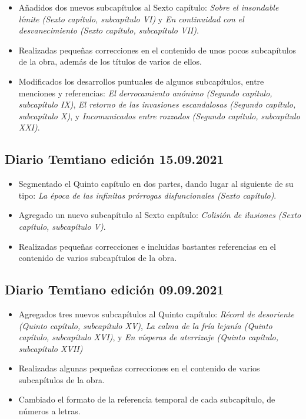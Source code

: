 \documentclass[
]{book}
\begin{document}
\begin{itemize}
\item
  Añadidos dos nuevos subcapítulos al Sexto capítulo: \emph{Sobre el insondable límite (Sexto capítulo, subcapítulo VI)} y \emph{En continuidad con el desvanecimiento (Sexto capítulo, subcapítulo VII)}.
\item
  Realizadas pequeñas correcciones en el contenido de unos pocos subcapítulos de la obra, además de los títulos de varios de ellos.
\item
  Modificados los desarrollos puntuales de algunos subcapítulos, entre menciones y referencias: \emph{El derrocamiento anónimo (Segundo capítulo, subcapítulo IX)}, \emph{El retorno de las invasiones escandalosas (Segundo capítulo, subcapítulo X)}, y \emph{Incomunicados entre rozzados (Segundo capítulo, subcapítulo XXI)}.
\end{itemize}

\hypertarget{diario-temtiano-ediciuxf3n-15.09.2021}{%
\subsection*{Diario Temtiano edición 15.09.2021}\label{diario-temtiano-ediciuxf3n-15.09.2021}}

\begin{itemize}
\item
  Segmentado el Quinto capítulo en dos partes, dando lugar al siguiente de su tipo: \emph{La época de las infinitas prórrogas disfuncionales (Sexto capítulo)}.
\item
  Agregado un nuevo subcapítulo al Sexto capítulo: \emph{Colisión de ilusiones (Sexto capítulo, subcapítulo V)}.
\item
  Realizadas pequeñas correcciones e incluidas bastantes referencias en el contenido de varios subcapítulos de la obra.
\end{itemize}

\hypertarget{diario-temtiano-ediciuxf3n-09.09.2021}{%
\subsection*{Diario Temtiano edición 09.09.2021}\label{diario-temtiano-ediciuxf3n-09.09.2021}}

\begin{itemize}
\item
  Agregados tres nuevos subcapítulos al Quinto capítulo: \emph{Récord de desoriente (Quinto capítulo, subcapítulo XV)}, \emph{La calma de la fría lejanía (Quinto capítulo, subcapítulo XVI)}, y \emph{En vísperas de aterrizaje (Quinto capítulo, subcapítulo XVII)}
\item
  Realizadas algunas pequeñas correcciones en el contenido de varios subcapítulos de la obra.
\item
  Cambiado el formato de la referencia temporal de cada subcapítulo, de números a letras.
\end{itemize}
\end{document}
